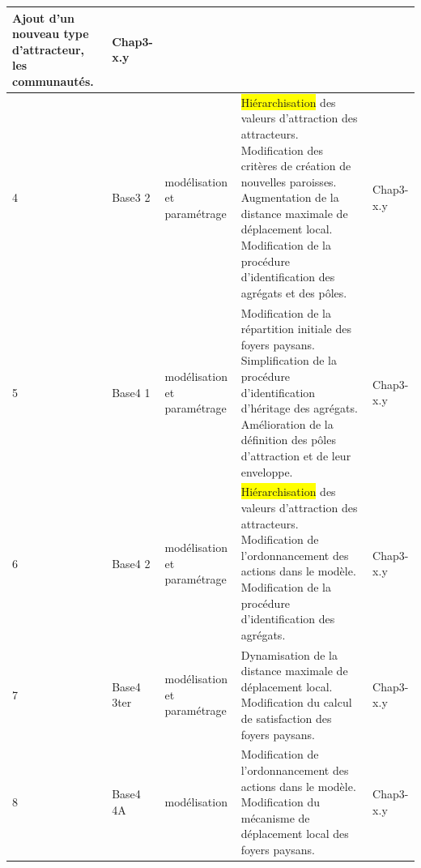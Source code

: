 \begin{footnotesize}
\begin{longtable}{ m{} m{}  m{}  m{}  m{}  }
		Ajout d'un nouveau type d'attracteur, les communautés. & Chap3-x.y\\
		\hline
		4 & Base3 2 & modélisation et paramétrage & \colorbox{yellow}{Hiérarchisation} des valeurs d'attraction des attracteurs. \newline
		Modification des critères de création de nouvelles paroisses. \newline
		Augmentation de la distance maximale de déplacement local. \newline
		Modification de la procédure d'identification des agrégats et des pôles. & Chap3-x.y\\
		\hline
		5 & Base4 1 & modélisation et paramétrage & 
		Modification de la répartition initiale des foyers paysans.\newline
		Simplification de la procédure d'identification d'héritage des agrégats.
		Amélioration de la définition des pôles d'attraction et de leur enveloppe. & Chap3-x.y\\
		\hline
		6 & Base4 2 & modélisation et paramétrage & \colorbox{yellow}{Hiérarchisation} des valeurs d'attraction des attracteurs. \newline
		Modification de l'ordonnancement des actions dans le modèle.\newline
		Modification de la procédure d'identification des agrégats. & Chap3-x.y\\
		\hline
		7 & Base4 3ter & modélisation et paramétrage &
		Dynamisation de la distance maximale de déplacement local.\newline
		Modification du calcul de satisfaction des foyers paysans. & Chap3-x.y\\
		\hline
		8 & Base4 4A & modélisation & Modification de l'ordonnancement des actions dans le modèle.\newline
		Modification du mécanisme de déplacement local des foyers paysans. & Chap3-x.y\\
		\hline
					
	\end{longtable}
\end{footnotesize}


